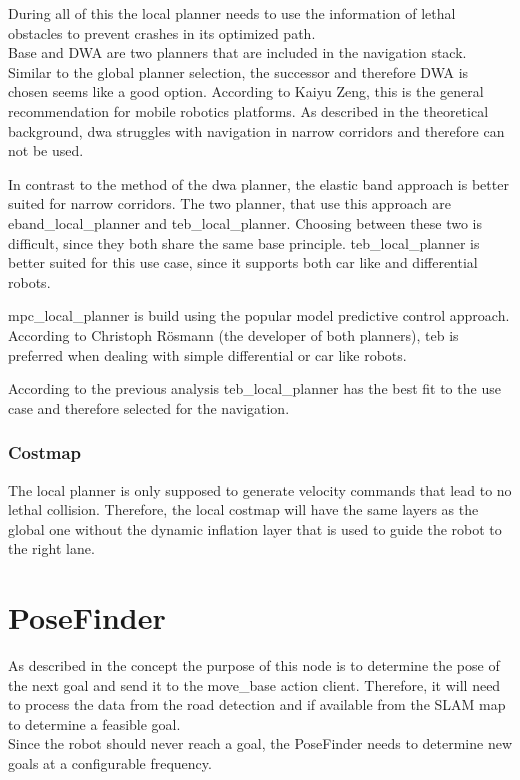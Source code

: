 During all of this the local planner needs to use the information of lethal obstacles to prevent crashes in its optimized path.\\


Base and DWA are two planners that are included in the navigation stack. Similar to the global planner selection, the successor and therefore DWA is chosen seems like a good option. According to Kaiyu Zeng, this is the general recommendation for mobile robotics platforms\cite{navtuningguide}. As described in the theoretical background, dwa struggles with navigation in narrow corridors and therefore can not be used.

In contrast to the method of the dwa planner, the elastic band approach is better suited for narrow corridors. The two planner, that use this approach are eband\_local\_planner and teb\_local\_planner. Choosing between these two is difficult, since they both share the same base principle. teb\_local\_planner is better suited for this use case, since it supports both car like and differential robots.

mpc\_local\_planner is build using the popular model predictive control approach. According to Christoph Rösmann (the developer of both planners), teb is preferred when dealing with simple differential or car like robots\cite{mpcvsteb}. 

According to the previous analysis teb\_local\_planner has the best fit to the use case and therefore selected for the navigation.


\subsubsection{Costmap}
The local planner is only supposed to generate velocity commands that lead to no lethal collision. Therefore, the local costmap will have the same layers as the global one without the dynamic inflation layer that is used to guide the robot to the right lane.


\section{PoseFinder}
As described in the concept the purpose of this node is to determine the pose of the next goal and send it to the move\_base action client. Therefore, it will need to process the data from the road detection and if available from the SLAM map to determine a feasible goal.\\

Since the robot should never reach a goal, the PoseFinder needs to determine new goals at a configurable frequency. 

